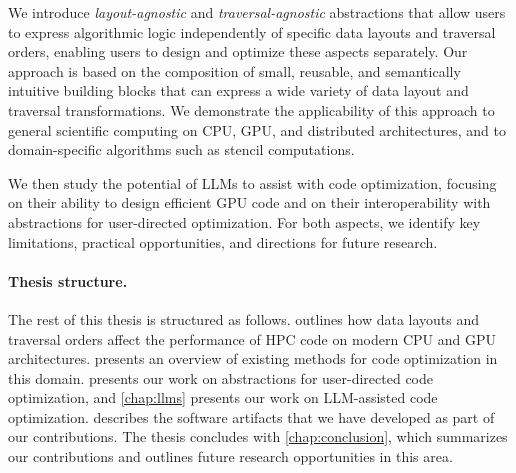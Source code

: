 We introduce \emph{layout-agnostic} and \emph{traversal-agnostic} abstractions that allow users to express algorithmic logic independently of specific data layouts and traversal orders, enabling users to design and optimize these aspects separately.
Our approach is based on the composition of small, reusable, and semantically intuitive building blocks that can express a wide variety of data layout and traversal transformations. We demonstrate the applicability of this approach to general scientific computing on CPU, GPU, and distributed architectures, and to domain-specific algorithms such as stencil computations.

We then study the potential of LLMs to assist with code optimization, focusing on their ability to design efficient GPU code and on their interoperability with abstractions for user-directed optimization. For both aspects, we identify key limitations, practical opportunities, and directions for future research.

\paragraph{Thesis structure.} The rest of this thesis is structured as follows.  outlines how data layouts and traversal orders affect the performance of HPC code on modern CPU and GPU architectures.  presents an overview of existing methods for code optimization in this domain.  presents our work on abstractions for user-directed code optimization, and \cref{chap:llms} presents our work on LLM-assisted code optimization.  describes the software artifacts that we have developed as part of our contributions. The thesis concludes with \cref{chap:conclusion}, which summarizes our contributions and outlines future research opportunities in this area.
